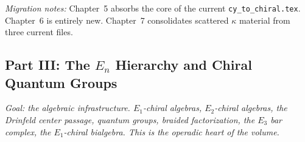 \documentclass[11pt]{article}
\newcommand{\En}{E_n}
\begin{document}
\textit{Migration notes:} Chapter~5 absorbs the core of the current
\texttt{cy\_to\_chiral.tex}. Chapter~6 is entirely new. Chapter~7
consolidates scattered $\kappa$ material from three current files.

\subsection{Part III: The $\En$ Hierarchy and Chiral Quantum Groups}
\label{sec:part-iii}

\textit{Goal: the algebraic infrastructure. $E_1$-chiral algebras,
$E_2$-chiral algebras, the Drinfeld center passage, quantum groups,
braided factorization, the $E_3$ bar complex, the $E_1$-chiral
bialgebra. This is the operadic heart of the volume.}
\end{document}
